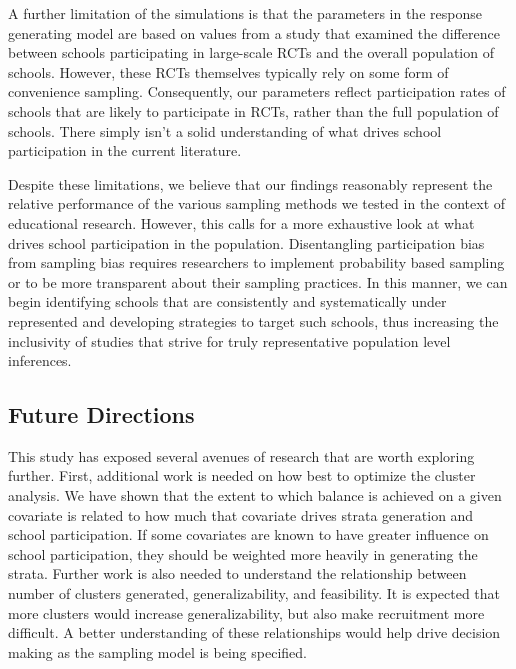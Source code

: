 \documentclass[man,floatsintext]{apa6}
\begin{document}
A further limitation of the simulations is that the parameters in the response generating model are based on values from a study that examined the difference between schools participating in large-scale RCTs and the overall population of schools. However, these RCTs themselves typically rely on some form of convenience sampling. Consequently, our parameters reflect participation rates of schools that are likely to participate in RCTs, rather than the full population of schools. There simply isn't a solid understanding of what drives school participation in the current literature.

Despite these limitations, we believe that our findings reasonably represent the relative performance of the various sampling methods we tested in the context of educational research. However, this calls for a more exhaustive look at what drives school participation in the population. Disentangling participation bias from sampling bias requires researchers to implement probability based sampling or to be more transparent about their sampling practices. In this manner, we can begin identifying schools that are consistently and systematically under represented and developing strategies to target such schools, thus increasing the inclusivity of studies that strive for truly representative population level inferences.

\hypertarget{future-directions}{%
\subsection{Future Directions}\label{future-directions}}

This study has exposed several avenues of research that are worth exploring further. First, additional work is needed on how best to optimize the cluster analysis. We have shown that the extent to which balance is achieved on a given covariate is related to how much that covariate drives strata generation and school participation. If some covariates are known to have greater influence on school participation, they should be weighted more heavily in generating the strata. Further work is also needed to understand the relationship between number of clusters generated, generalizability, and feasibility. It is expected that more clusters would increase generalizability, but also make recruitment more difficult. A better understanding of these relationships would help drive decision making as the sampling model is being specified.
\end{document}
